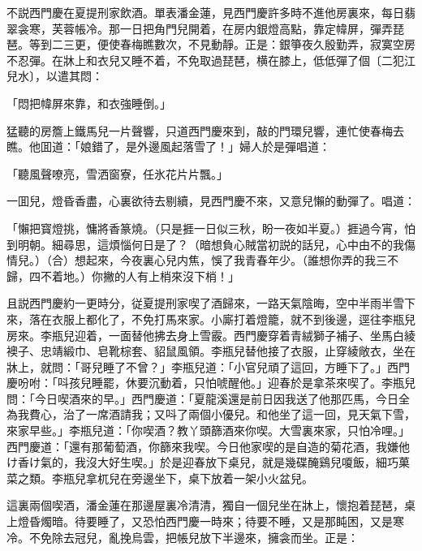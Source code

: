 不説西門慶在夏提刑家飲酒。單表潘金蓮，見西門慶許多時不進他房裏來，每日翡翠衾寒，芙蓉帳冷。那一日把角門兒開着，在房内銀燈高點，靠定幃屏，彈弄琵琶。等到二三更，便使春梅瞧數次，不見動靜。正是：銀箏夜久殷勤弄，寂寞空房不忍彈。在牀上和衣兒又睡不着，不免取過琵琶，横在膝上，低低彈了個〔二犯江兒水〕，以遣其悶：

\begin{myquote}
「悶把幃屏來靠，和衣強睡倒。」
\end{myquote}

猛聽的房簷上鐵馬兒一片聲響，只道西門慶來到，敲的門環兒響，連忙使春梅去瞧。他囬道：「娘錯了，是外邊風起落雪了！」婦人於是彈唱道：

\begin{myquote}
「聽風聲嘹亮，雪洒窗寮，任氷花片片飄。」
\end{myquote}

一囬兒，燈昏香盡，心裏欲待去剔續，見西門慶不來，又意兒懶的動彈了。唱道：

\begin{myquote}
「懶把寳燈挑，慵將香篆燒。{\marktext\small\color{mydarkgray}（只是捱一日似三秋，盼一夜如半夏。）}捱過今宵，怕到明朝。細尋思，這煩惱何日是了？{\marktext\small\color{mydarkgray}（暗想負心賊當初説的話兒，心中由不的我傷情兒。）}{\marktext\small（合）}想起來，今夜裏心兒内焦，悞了我青春年少。{\marktext\small\color{mydarkgray}（誰想你弄的我三不歸，四不着地。）}你撇的人有上梢來沒下梢！」
\end{myquote}

且説西門慶約一更時分，従夏提刑家喫了酒歸來，一路天氣陰晦，空中半雨半雪下來，落在衣服上都化了，不免打馬來家。小廝打着燈籠，就不到後邊，逕往李瓶兒房來。李瓶兒迎着，一面替他拂去身上雪霰。西門慶穿着青絨獅子補子、坐馬白綾襖子、忠靖緞巾、皂靴棕套、貂鼠風領。李瓶兒替他接了衣服，止穿綾敞衣，坐在牀上，就問：「哥兒睡了不曾？」李瓶兒道：「小官兒頑了這回，方睡下了。」西門慶吩咐：「呌孩兒睡罷，休要沉動着，只怕唬醒他。」迎春於是拿茶來喫了。李瓶兒問：「今日喫酒來的早。」西門慶道：「夏龍溪還是前日因我送了他那匹馬，今日全為我費心，治了一席酒請我；又呌了兩個小優兒。和他坐了這一回，見天氣下雪，來家早些。」李瓶兒道：「你喫酒？教丫頭篩酒來你喫。大雪裏來家，只怕冷哩。」西門慶道：「還有那葡萄酒，你篩來我喫。今日他家喫的是自造的菊花酒，我嫌他け香け氣的，我沒大好生喫。」於是迎春放下桌兒，就是幾碟醃鷄兒嗄飯，細巧菓菜之類。李瓶兒拿杌兒在旁邊坐下，桌下放着一架小火盆兒。

這裏兩個喫酒，潘金蓮在那邊屋裏冷清清，獨自一個兒坐在牀上，懷抱着琵琶，桌上燈昏燭暗。待要睡了，又恐怕西門慶一時來；待要不睡，又是那盹困，又是寒冷。不免除去冠兒，亂挽烏雲，把帳兒放下半邊來，擁衾而坐。正是：

